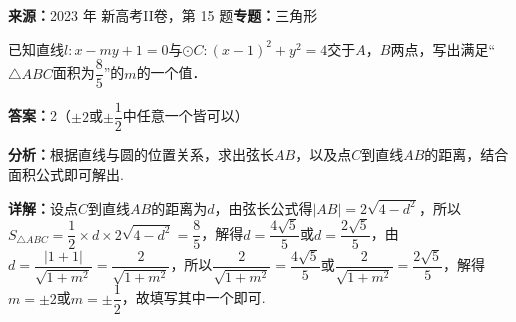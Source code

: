 \begin{question}[points=5]
\textbf{来源：}2023 年 新高考II卷，第 15 题\quad \textbf{专题：}三角形\par
已知直线$l:x-my+1=0$与$\odot C:(x-1)^{2}+y^{2}=4$交于$A$，$B$两点，写出满足“$\triangle ABC$面积为$\dfrac{8}{5}$”的$m$的一个值．
\begin{solution}
\textbf{答案：}2（$\pm2$或$\pm\dfrac{1}{2}$中任意一个皆可以）

\textbf{分析：}根据直线与圆的位置关系，求出弦长$AB$，以及点$C$到直线$AB$的距离，结合面积公式即可解出.

\textbf{详解：}设点$C$到直线$AB$的距离为$d$，由弦长公式得$|AB|=2\sqrt{4-d^{2}}$，所以$S_{\triangle ABC}=\dfrac{1}{2}\times d\times2\sqrt{4-d^{2}}=\dfrac{8}{5}$，解得$d=\dfrac{4\sqrt{5}}{5}$或$d=\dfrac{2\sqrt{5}}{5}$，由$d=\dfrac{|1+1|}{\sqrt{1+m^{2}}}=\dfrac{2}{\sqrt{1+m^{2}}}$，所以$\dfrac{2}{\sqrt{1+m^{2}}}=\dfrac{4\sqrt{5}}{5}$或$\dfrac{2}{\sqrt{1+m^{2}}}=\dfrac{2\sqrt{5}}{5}$，解得$m=\pm2$或$m=\pm\dfrac{1}{2}$，故填写其中一个即可.
\end{solution}
\end{question}

